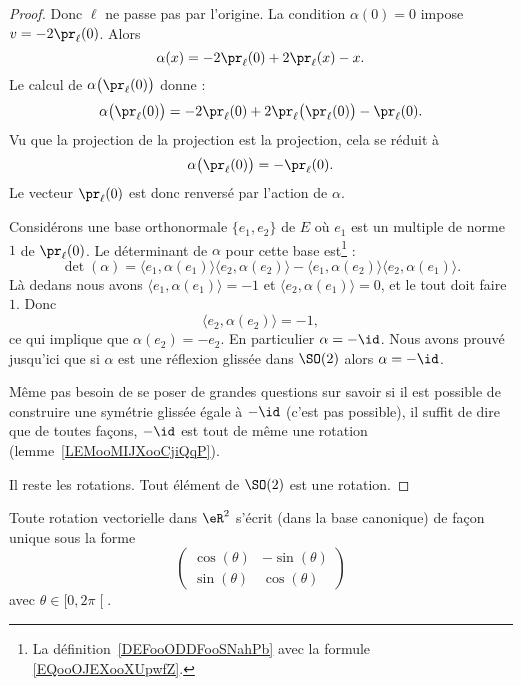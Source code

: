 \begin{proof}
    Donc \( \ell\) ne passe pas par l'origine. La condition \( \alpha(0)=0\) impose \( v=-2\pr_{\ell}(0)\). Alors
    \begin{equation}
        \alpha(x)=-2\pr_{\ell}(0)+2\pr_{\ell}(x)-x.
    \end{equation}
    Le calcul de \( \alpha\big( \pr_{\ell}(0) \big)\) donne :
    \begin{equation}
        \alpha\big( \pr_{\ell}(0) \big)=-2\pr_{\ell}(0)+2\pr_{\ell}\big( \pr_{\ell}(0) \big)-\pr_{\ell}(0).
    \end{equation}
    Vu que la projection de la projection est la projection, cela se réduit à
    \begin{equation}
        \alpha\big( \pr_{\ell}(0) \big)=-\pr_{\ell}(0).
    \end{equation}
    Le vecteur \( \pr_{\ell}(0)\) est donc renversé par l'action de \( \alpha\).

    Considérons une base orthonormale \( \{ e_1,e_2 \}\) de \( E\) où \(e_1 \) est un multiple de norme \( 1\) de \( \pr_{\ell}(0)\). Le déterminant de \( \alpha\) pour cette base est\footnote{La définition~\ref{DEFooODDFooSNahPb} avec la formule \eqref{EQooOJEXooXUpwfZ}.} :
    \begin{equation}
        \det(\alpha)=\langle e_1, \alpha(e_1)\rangle \langle e_2, \alpha(e_2)\rangle -\langle e_1, \alpha(e_2)\rangle \langle e_2, \alpha(e_1)\rangle.
    \end{equation}
    Là dedans nous avons \( \langle e_1, \alpha(e_1)\rangle =-1\) et \( \langle e_2, \alpha(e_1)\rangle =0\), et le tout doit faire \( 1\). Donc
    \begin{equation}
        \langle e_2, \alpha(e_2)\rangle =-1,
    \end{equation}
    ce qui implique que \( \alpha(e_2)=-e_2\). En particulier \( \alpha=-\id\). Nous avons prouvé jusqu'ici que si \( \alpha\) est une réflexion glissée dans \( \SO(2)\) alors \( \alpha=-\id\).

    Même pas besoin de se poser de grandes questions sur savoir si il est possible de construire une symétrie glissée égale à \( -\id\) (c'est pas possible), il suffit de dire que de toutes façons, \( -\id\) est tout de même une rotation (lemme~\ref{LEMooMIJXooCjiQqP}).

    Il reste les rotations. Tout élément de \( \SO(2)\) est une rotation.
\end{proof}

\begin{proposition}         \label{PROPooOTIVooZpvLnb}
    Toute rotation vectorielle dans \( \eR^2\) s'écrit (dans la base canonique) de façon unique sous la forme
    \begin{equation}
        \begin{pmatrix}
            \cos(\theta)    &   -\sin(\theta)    \\
            \sin(\theta)    &   \cos(\theta)
        \end{pmatrix}
    \end{equation}
    avec \( \theta\in\mathopen[ 0 , 2\pi \mathclose[\).
\end{proposition}

